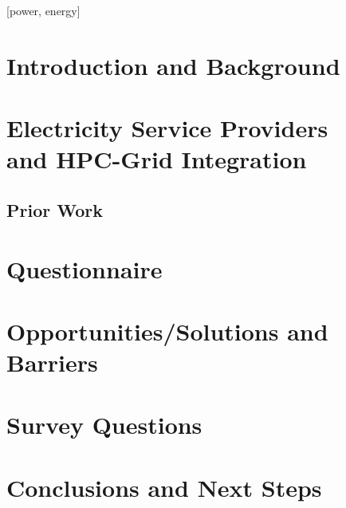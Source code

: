 \documentclass{../style/sig-alternate}
\begin{document}

[power, energy]



%
\section{Introduction and Background}

\label{sec:intro}

\section{Electricity Service Providers\\
 and HPC-Grid Integration}

\label{sec:supercomputer}

\subsection{Prior Work}

\label{sec:priorwork}

\section{Questionnaire} 

\label{sec:questionnaire}

\section{Opportunities/Solutions and\\ Barriers} 

\label{sec:opportunities}

\section{Survey Questions}

\label{sec:questions}

\section{Conclusions and Next Steps}

\label{sec:conclusion}


%
%

%

%

%
\end{document}
